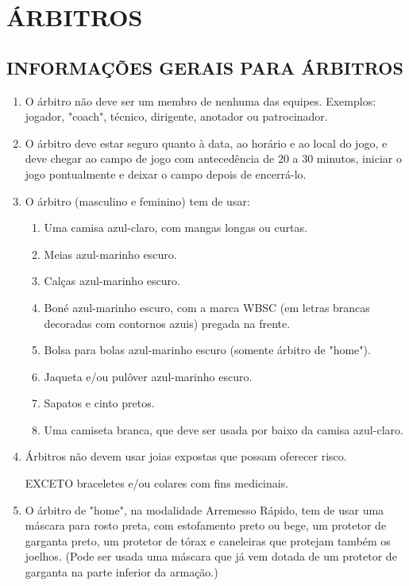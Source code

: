 \chapter{ÁRBITROS}



\section{INFORMAÇÕES GERAIS PARA ÁRBITROS }
\begin{multicols}{2}  
	\begin{enumerate}[label=\alph*)]
		\item O árbitro não deve ser um membro de nenhuma das equipes. Exemplos: jogador, 
		"coach", técnico, dirigente, anotador ou patrocinador. 
		
		\item  O árbitro deve estar seguro quanto à data, ao horário e ao local do jogo, e deve 
		chegar ao campo de jogo com antecedência de 20 a 30 minutos, iniciar o jogo 
		pontualmente e deixar o campo depois de encerrá-lo. 
		
		\item  O árbitro (masculino e feminino) tem de usar: 
		\begin{enumerate}[label= \arabic*)]
			\item  Uma camisa azul-claro, com mangas longas ou curtas. 
			\item  Meias azul-marinho escuro. 
			\item  Calças azul-marinho escuro. 
			\item  Boné azul-marinho escuro, com a marca WBSC (em letras brancas decoradas com 
			contornos azuis) pregada na frente. 
			\item  Bolsa para bolas azul-marinho escuro (somente árbitro de "home"). 
			\item  Jaqueta e/ou pulôver azul-marinho escuro. 
			\item  Sapatos e cinto pretos. 
			\item  Uma camiseta branca, que deve ser usada por baixo da camisa azul-claro. 
		\end{enumerate}
		
		
		\item  Árbitros não devem usar joias expostas que possam oferecer risco. 
		
		EXCETO braceletes e/ou colares com fins medicinais. 
		
		\item  O árbitro de "home", na modalidade Arremesso Rápido, tem de usar uma máscara para rosto preta, com estofamento preto ou bege, um protetor de garganta preto, um protetor de tórax e caneleiras que protejam também os joelhos. (Pode ser usada uma máscara que já vem dotada de um protetor de garganta na parte inferior da armação.) 
		

\end{enumerate}
\end{multicols}
